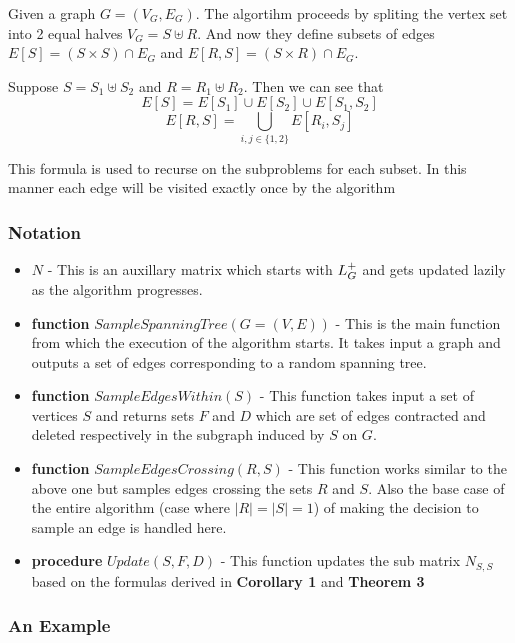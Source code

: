 Given a graph $G = (V_G, E_G)$. The algortihm proceeds by spliting the vertex set into 2 equal halves $V_G = S \uplus R$. And now they define subsets of edges $E[S] = (S \times S) \cap E_G$ and $E[R, S] = (S \times R) \cap E_G$. 

Suppose $S = S_1 \uplus S_2$ and $R = R_1 \uplus R_2$. Then we can see that 
$$ E[S] = E[S_1] \cup E[S_2] \cup E[S_1, S_2] $$ 
$$ E[R, S] = \bigcup\limits_{i,j \in \{1,2\} } E[R_i, S_j] $$

This formula is used to recurse on the subproblems for each subset. In this manner each edge will be visited exactly once by the algorithm

\subsubsection{Notation}
\begin{itemize}
 \item $N$ - This is an auxillary matrix which starts with $L_{G}^{+}$ and gets updated lazily as the algorithm progresses.
 \item \textbf{function} $SampleSpanningTree(G = (V, E))$ - This is the main function from which the execution of the algorithm starts. It takes input a graph and outputs a set of edges corresponding to a random spanning tree.
 \item \textbf{function} $SampleEdgesWithin(S)$ - This function takes input a set of vertices $S$ and returns sets $F$ and $D$ which are set of edges contracted and deleted respectively in the subgraph induced by $S$ on $G$. 
 \item \textbf{function} $SampleEdgesCrossing(R,S)$ - This function works similar to the above one but samples edges crossing the sets $R$ and $S$. Also the base case of the entire algorithm (case where $|R| = |S| = 1$) of making the decision to sample an edge is handled here.
 \item \textbf{procedure} $Update(S,F,D)$ - This function updates the sub matrix $N_{S,S}$ based on the formulas derived in \textbf{Corollary 1} and \textbf{Theorem 3}
\end{itemize}

\pagebreak

\subsubsection{An Example}

